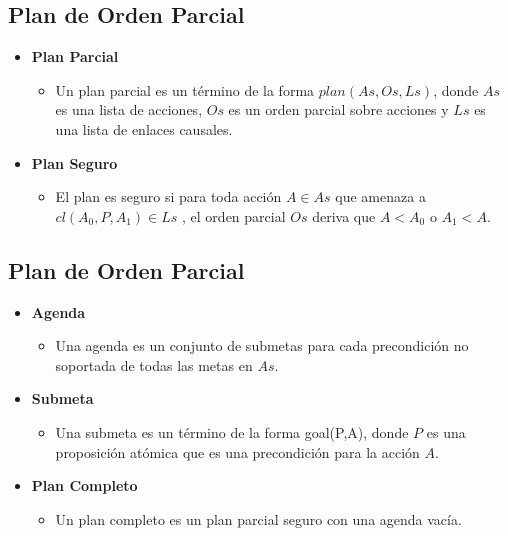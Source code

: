 \documentclass[11pt]{article}
\begin{document}
\subsection*{Plan de Orden Parcial}
\label{sec:org3fb5109}

\begin{itemize}
\item \textbf{{\color{green}Plan Parcial}}
\begin{itemize}
\item Un {\color{red}plan parcial} es un término de la forma
\(plan(As,Os,Ls)\), donde \(As\) es una lista de acciones, \(Os\) es
un orden parcial sobre acciones y \(Ls\) es una lista de enlaces
causales.
\end{itemize}
\item \textbf{{\color{green}Plan Seguro}}
\begin{itemize}
\item El plan es {\color{red}seguro} si para toda acción \(A\in As\)
que amenaza a \(cl(A_0,P,A_1)\in Ls\) , el orden parcial \(Os\)
deriva que \(A< A_0\) o \(A_1 < A\).
\end{itemize}
\end{itemize}

\subsection*{Plan de Orden Parcial}
\label{sec:org8f7bd1f}

\begin{itemize}
\item \textbf{{\color{green}Agenda}}
\begin{itemize}
\item Una {\color{red}agenda} es un conjunto de submetas para cada
precondición no soportada de todas las metas en \(As\).
\end{itemize}
\item \textbf{{\color{green}Submeta}}
\begin{itemize}
\item Una {\color{red}submeta} es un término de la forma {\color{red}goal(P,A)}, donde \(P\) es
una proposición atómica que es una precondición para la acción
\(A\).
\end{itemize}
\item \textbf{{\color{green}Plan Completo}}
\begin{itemize}
\item Un {\color{red}plan completo} es un plan parcial seguro con una
agenda vacía.
\end{itemize}
\end{itemize}
\end{document}
